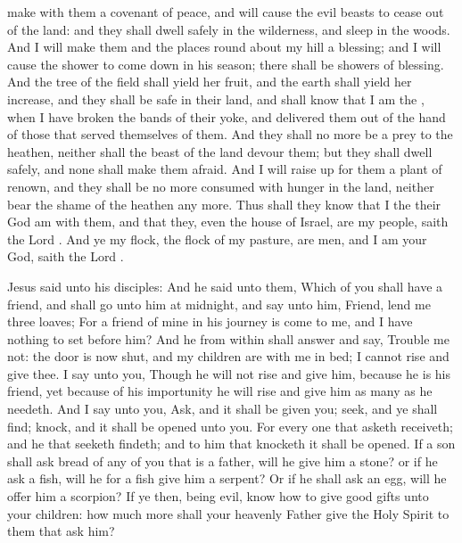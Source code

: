  make with them a covenant of peace, and will cause the evil beasts to cease out of the land: and they shall dwell safely in the wilderness, and sleep in the woods. And I will make them and the places round about my hill a blessing; and I will cause the shower to come down in his season; there shall be showers of blessing. And the tree of the field shall yield her fruit, and the earth shall yield her increase, and they shall be safe in their land, and shall know that I am the , when I have broken the bands of their yoke, and delivered them out of the hand of those that served themselves of them. And they shall no more be a prey to the heathen, neither shall the beast of the land devour them; but they shall dwell safely, and none shall make them afraid. And I will raise up for them a plant of renown, and they shall be no more consumed with hunger in the land, neither bear the shame of the heathen any more. Thus shall they know that I the  their God am with them, and that they, even the house of Israel, are my people, saith the Lord . And ye my flock, the flock of my pasture, are men, and I am your God, saith the Lord .


 Jesus said unto his disciples: And he said unto them, Which of you shall have a friend, and shall go unto him at midnight, and say unto him, Friend, lend me three loaves; For a friend of mine in his journey is come to me, and I have nothing to set before him? And he from within shall answer and say, Trouble me not: the door is now shut, and my children are with me in bed; I cannot rise and give thee. I say unto you, Though he will not rise and give him, because he is his friend, yet because of his importunity he will rise and give him as many as he needeth. And I say unto you, Ask, and it shall be given you; seek, and ye shall find; knock, and it shall be opened unto you. For every one that asketh receiveth; and he that seeketh findeth; and to him that knocketh it shall be opened. If a son shall ask bread of any of you that is a father, will he give him a stone? or if he ask a fish, will he for a fish give him a serpent? Or if he shall ask an egg, will he offer him a scorpion? If ye then, being evil, know how to give good gifts unto your children: how much more shall your heavenly Father give the Holy Spirit to them that ask him?

